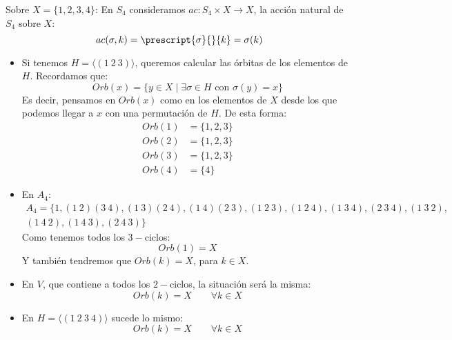 \begin{ejemplo}
    Sobre $X = \{1,2,3,4\}$:
    En $S_4$ consideramos $ac:S_4\times X\to X$, la acción natural de $S_4$ sobre $X$:
        \begin{equation*}
            ac(\sigma,k) = \prescript{\sigma}{}{k} = \sigma(k)
        \end{equation*}
    \begin{itemize}
        \item Si tenemos $H = \langle (1\ 2\ 3) \rangle $, queremos calcular las órbitas de los elementos de $H$. Recordamos que:
            \begin{equation*}
                Orb(x) = \{y\in X \mid \exists \sigma\in H \text{\ con\ } \sigma(y) = x\}
            \end{equation*}
            Es decir, pensamos en $Orb(x)$ como en los elementos de $X$ desde los que podemos llegar a $x$ con una permutación de $H$. De esta forma:
            \begin{align*}
                Orb(1) &= \{1,2,3\} \\
                Orb(2) &= \{1, 2, 3\} \\
                Orb(3) &= \{1, 2, 3\} \\
                Orb(4) &= \{4\}
            \end{align*}
        \item En $A_4$:
            \begin{multline*}
                A_4 = \{1, (1\ 2)(3\ 4), (1\ 3)(2\ 4), (1\ 4)(2\ 3), (1\ 2\ 3), (1\ 2\ 4), (1\ 3\ 4), (2\ 3\ 4), (1\ 3\ 2),\\ (1\ 4\ 2), (1\ 4\ 3), (2\ 4\ 3)\}
            \end{multline*}
            Como tenemos todos los $3-$ciclos:
            \begin{equation*}
                Orb(1) = X
            \end{equation*}
            Y también tendremos que $Orb(k) = X$, para $k\in X$.
        \item En $V$, que contiene a todos los $2-$ciclos, la situación será la misma:
            \begin{equation*}
                Orb(k) = X \qquad \forall k\in X
            \end{equation*}
        \item En $H = \langle (1\ 2\ 3\ 4) \rangle $ sucede lo mismo:
            \begin{equation*}
                Orb(k) = X \qquad \forall k\in X
            \end{equation*}
    \end{itemize}
\end{ejemplo}

